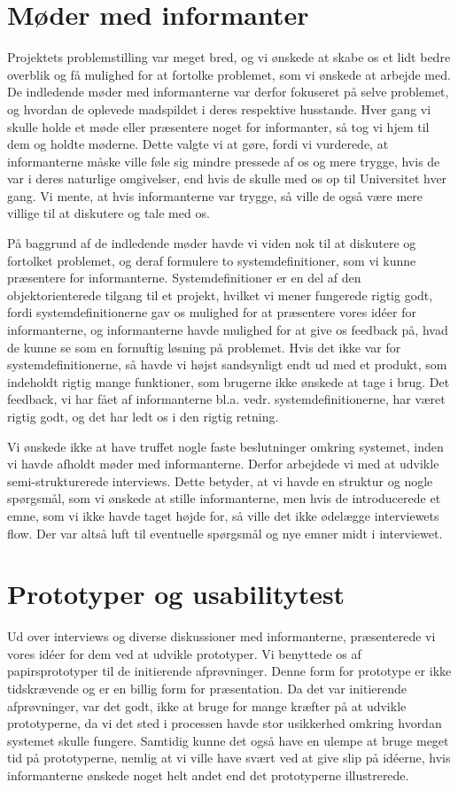 \section{Møder med informanter}
Projektets problemstilling var meget bred, og vi ønskede at skabe os et lidt bedre overblik og få mulighed for at fortolke problemet, som vi ønskede at arbejde med. De indledende møder med informanterne var derfor fokuseret på selve problemet, og hvordan de oplevede madspildet i deres respektive husstande. Hver gang vi skulle holde et møde eller præsentere noget for informanter, så tog vi hjem til dem og holdte møderne. Dette valgte vi at gøre, fordi vi vurderede, at informanterne måske ville føle sig mindre pressede af os og mere trygge, hvis de var i deres naturlige omgivelser, end hvis de skulle med os op til Universitet hver gang. Vi mente, at hvis informanterne var trygge, så ville de også være mere villige til at diskutere og tale med os.

På baggrund af de indledende møder havde vi viden nok til at diskutere og fortolket problemet, og deraf formulere to systemdefinitioner, som vi kunne præsentere for informanterne. Systemdefinitioner er en del af den objektorienterede tilgang til et projekt, hvilket vi mener fungerede rigtig godt, fordi systemdefinitionerne gav os mulighed for at præsentere vores idéer for informanterne, og informanterne havde mulighed for at give os feedback på, hvad de kunne se som en fornuftig løsning på problemet. Hvis det ikke var for systemdefinitionerne, så havde vi højst sandsynligt endt ud med et produkt, som indeholdt rigtig mange funktioner, som brugerne ikke ønskede at tage i brug. Det feedback, vi har fået af informanterne bl.a. vedr. systemdefinitionerne, har været rigtig godt, og det har ledt os i den rigtig retning. 

Vi ønskede ikke at have truffet nogle faste beslutninger omkring systemet, inden vi havde afholdt møder med informanterne. Derfor arbejdede vi med at udvikle semi-strukturerede interviews. Dette betyder, at vi havde en struktur og nogle spørgsmål, som vi ønskede at stille informanterne, men hvis de introducerede et emne, som vi ikke havde taget højde for, så ville det ikke ødelægge interviewets flow. Der var altså luft til eventuelle spørgsmål og nye emner midt i interviewet.

\section{Prototyper og usabilitytest}
Ud over interviews og diverse diskussioner med informanterne, præsenterede vi vores idéer for dem ved at udvikle prototyper. Vi benyttede os af papirsprototyper til de initierende afprøvninger. Denne form for prototype er ikke tidskrævende og er en billig form for præsentation. Da det var initierende afprøvninger, var det godt, ikke at bruge for mange kræfter på at udvikle prototyperne, da vi det sted i processen havde stor usikkerhed omkring hvordan systemet skulle fungere. Samtidig kunne det også have en ulempe at bruge meget tid på prototyperne, nemlig at vi ville have svært ved at give slip på idéerne, hvis informanterne ønskede noget helt andet end det prototyperne illustrerede.

